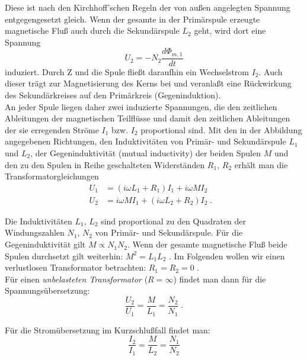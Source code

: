 \noindent
Diese ist nach den Kirchhoff'schen Regeln der von außen angelegten Spannung entgegengesetzt gleich. Wenn der gesamte in der Primärspule erzeugte magnetische Fluß auch durch die Sekundärspule $L_2$ geht, wird dort eine Spannung
\begin{equation}
U_2 = -N_2\frac{d\Phi_{m,1}}{dt}
\end{equation}
induziert. Durch Z und die Spule fließt daraufhin ein Wechselstrom $I_2$. Auch dieser trägt zur Magnetisierung des Kerns bei und veranlaßt eine Rückwirkung des Sekundärkreises auf den Primärkreis (Gegeninduktion).\\
An jeder Spule liegen daher zwei induzierte Spannungen, die den zeitlichen Ableitungen der magnetischen Teilflüsse und damit den zeitlichen Ableitungen der sie erregenden Ströme $I_1$ bzw. $I_2$ proportional sind. Mit den in der Abbildung angegebenen Richtungen, den Induktivitäten von Primär- und Sekundärspule $L_1$und $L_2$, der Gegeninduktivität (mutual inductivity) der beiden Spulen $M$ und den zu den Spulen in Reihe geschalteten Widerständen $R_1$, $R_2$ erhält man die Transformatorgleichungen
\begin{align*}
U_1 & = (i\omega L_1 + R_1) I_1 + i\omega M I_2 &\\
U_2 & = i\omega M I_1 + (i\omega L_2 + R_2) I_2 \; .
\end{align*}

Die Induktivitäten $L_1$, $L_2$ sind proportional zu den Quadraten der Windungszahlen $N_1$, $N_2$ von Primär- und Sekundärspule. Für die Gegeninduktivität gilt $M\propto N_1N_2$. Wenn der gesamte magnetische Fluß beide Spulen durchsetzt gilt weiterhin: $M^2 = L_1L_2$\; . Im Folgenden wollen wir einen verlustlosen Transformator betrachten: $R_1 = R_2 = 0$\; .\\
Für einen \textit{unbelasteten Transformator} ($R = \infty$) findet man dann für die Spannungsübersetzung:
\begin{equation} \label{eq:Spannungsuebersetzung}
\frac{U_2}{U_1} = \frac{M}{L_1} = \frac{N_2}{N_1}\; .
\end{equation}

\noindent
Für die Stromübersetzung im Kurzschlußfall findet man:
\begin{equation} \label{eq:Stromuebersetzung}
\frac{I_2}{I_1} = \frac{M}{L_2} = \frac{N_1}{N_2}
\end{equation}

